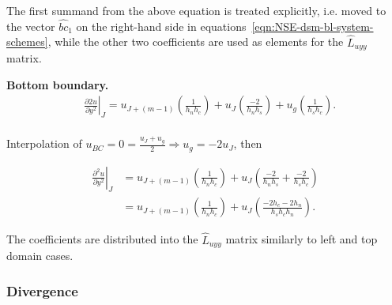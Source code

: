 \documentclass{article}
\begin{document}
The first summand from the above equation is treated explicitly, i.e. moved to the vector $\hat{bc}_1$ on the right-hand side in equations~\eqref{eqn:NSE-dsm-bl-system-schemes}, while the other two coefficients are used as elements for the $\hat{L}_{uyy}$ matrix.

\textbf{Bottom boundary.} 
\begin{equation}
\begin{aligned}
&\left.\frac{\partial 2 u}{\partial y^2}\right|_J=u_{J+(m-1)}\left(\frac{1}{h_n h_c}\right)+u_J\left(\frac{-2}{h_n h_s}\right)+u_g\left(\frac{1}{h_s h_c}\right).\\
\end{aligned}
\end{equation}

Interpolation of $u_{B C} =0=\frac{u_J+u_g}{2} \Rightarrow u_g=-2 u_J$, then

\begin{equation}
\begin{aligned}
\left.\frac{\partial^2 u}{\partial y^2}\right|_J & =u_{J+(m-1)}\left(\frac{1}{h_n h_c}\right)+u_J\left(\frac{-2}{h_n h_s}+\frac{-2}{h_s h_c}\right) \\
 & =u_{J+(m-1)}\left(\frac{1}{h_n h_c}\right)+u_J\left(\frac{-2 h_c-2 h_n}{h_s h_c h_n}\right).
\end{aligned}
\end{equation}

The coefficients are distributed into the $\hat{L}_{uyy}$ matrix similarly to left and top domain cases.


\subsubsection{Divergence}\label{subsec:divergence}
\end{document}
